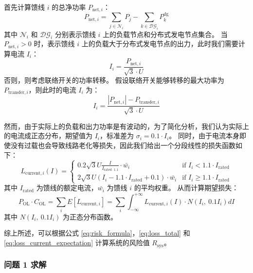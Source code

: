 \documentclass{article}
\begin{document}
首先计算馈线 $i$ 的总净功率 $P_{\text{net},i}$：
\begin{equation}\label{eq:net_power}
  P_{\text{net},i} = \sum_{j\in\mathcal{N}_i} P_j - \sum_{k\in\mathcal{DG}_i} P_k^{\text{dg}}
\end{equation}
其中 $\mathcal{N}_i$ 和 $\mathcal{DG}_i$ 分别表示馈线 $i$ 上的负载节点和分布式发电节点集合。
当 $P_{\text{net},i} > 0$ 时，表示馈线 $i$ 上的负载大于分布式发电节点的出力，此时我们需要计算电流 $I_i$：
\begin{equation}\label{eq:current}
  I_i = \frac{P_{\text{net},i}}{\sqrt{3} \cdot U}
\end{equation}
否则，则考虑联络开关的功率转移。
假设联络开关能够转移的最大功率为 $P_{\text{transfer},i}$，则此时的电流 $I_i$ 为：
\begin{equation}\label{eq:current_transfer}
  I_i = \frac{|P_{\text{net},i}| - P_{\text{transfer},i}}{\sqrt{3} \cdot U}
\end{equation}

然而，由于实际上的负载和出力功率是有波动的，为了简化分析，我们认为实际上的电流成正态分布，期望值为 $I_i$，标准差为 $\sigma_i = 0.1 \cdot I_i$。
同时，由于电流本身即使没有过载也会导致线路老化等损失，因此我们给出一个分段线性的损失函数如下：
\begin{equation}\label{eq:loss_current}
  L_{\text{current},i} (I) =
  \begin{cases}
    0.2 \sqrt{3} U \frac{I}{I_{\text{rated} \cdot 1.1}} \cdot \bar{w_i} & \text{if } I_i < 1.1 \cdot I_{\text{rated}} \\
    2 \sqrt{3} U (I_i - 1.1 \cdot I_{\text{rated}} + 0.1) \cdot \bar{w_i} & \text{if } I_i \geq 1.1 \cdot I_{\text{rated}}
  \end{cases}
\end{equation}
其中 $I_{\text{rated}}$ 为馈线的额定电流，$\bar{w_i}$ 为馈线 $i$ 的平均权重。
从而计算期望损失：
\begin{equation}\label{eq:loss_current_expectation}
  P_{\text{OL}} \cdot C_{\text{OL}}
  = \sum_i E[L_{\text{current},i}]
  = \sum_i \int_{-\infty}^{+\infty} L_{\text{current},i}(I) \cdot N(I_i,\ 0.1 I_i) dI
\end{equation}
其中 $N(I_i,\ 0.1 I_i)$ 为正态分布函数。

综上所述，可以根据公式 \ref{eq:risk_formula}，\ref{eq:loss_total} 和 \ref{eq:loss_current_expectation} 计算系统的风险值 $R_{\text{sys}}$。

\subsubsection{问题 1 求解}\label{subsubsec:problem1_solve}
\end{document}
